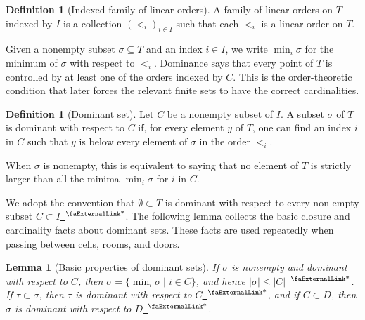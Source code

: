 \documentclass{article}
\newtheorem{lemma}[theorem]{Lemma}
\theoremstyle{definition}
\newtheorem{definition}[theorem]{Definition}
\newcommand{\extlink}{~\ensuremath{{}^\text{\faExternalLink*}}}
\begin{document}
\begin{definition}[Indexed family of linear orders]\label{def:linearorder}
A family of linear orders on $T$ indexed by $I$ is a collection $(<_i)_{i \in I}$ such that each $<_i$ is a linear order on $T$.
\end{definition}

Given a nonempty subset $\sigma \subseteq T$ and an index $i \in I$, we write $\min_i \sigma$ for the minimum of $\sigma$ with respect to $<_i$. Dominance says that every point of $T$ is controlled by at least one of the orders indexed by $C$. This is the order-theoretic condition that later forces the relevant finite sets to have the correct cardinalities.

\begin{definition}[Dominant set]
Let $C$ be a nonempty subset of $I$. A subset $\sigma$ of $T$ is dominant with respect to $C$ if, for every element $y$ of $T$, one can find an index $i$ in $C$ such that $y$ is below every element of $\sigma$ in the order $<_i$.

When $\sigma$ is nonempty, this is equivalent to saying that no element of $T$ is strictly larger than all the minima $\min_i \sigma$ for $i$ in $C$.
\end{definition}

We adopt the convention that $\emptyset \subset T$ is dominant with respect to every non-empty subset $C \subset I$\href{https://github.com/Solo-ary/Game-Theory-Formalization/blob/7b49d5267d4f26b17bdf071250880b63e96999b6/Brouwer/Gametheory/Scarf.lean#L167-L175}{\extlink}. The following lemma collects the basic closure and cardinality facts about dominant sets. These facts are used repeatedly when passing between cells, rooms, and doors.

\begin{lemma}[Basic properties of dominant sets]\label{def:Lemma1}
If $\sigma$ is nonempty and dominant with respect to $C$, then
$\sigma = \{\min_i \sigma \mid i \in C\}$, and hence
$|\sigma| \le |C|$\href{https://github.com/Solo-ary/Game-Theory-Formalization/blob/7b49d5267d4f26b17bdf071250880b63e96999b6/Brouwer/Gametheory/Scarf.lean#L138-L165}{\extlink}.
If $\tau \subset \sigma$, then $\tau$ is dominant with respect to
$C$\href{https://github.com/Solo-ary/Game-Theory-Formalization/blob/7b49d5267d4f26b17bdf071250880b63e96999b6/Brouwer/Gametheory/Scarf.lean#L115-L124}{\extlink},
and if $C \subset D$, then $\sigma$ is dominant with respect to
$D$\href{https://github.com/Solo-ary/Game-Theory-Formalization/blob/7b49d5267d4f26b17bdf071250880b63e96999b6/Brouwer/Gametheory/Scarf.lean#L126-L134}{\extlink}.
\end{lemma}
\end{document}
